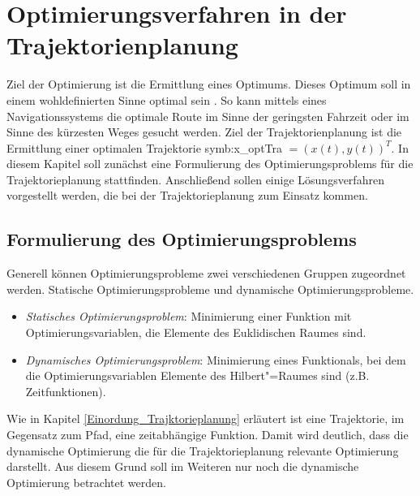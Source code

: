 \section{Optimierungsverfahren in der Trajektorienplanung}
Ziel der Optimierung ist die Ermittlung eines Optimums. 
Dieses Optimum soll in einem wohldefinierten Sinne optimal sein \cite{Ziegler2017}.
So kann mittels eines Navigationssystems die optimale Route im Sinne der geringsten Fahrzeit oder im Sinne des k\"urzesten Weges gesucht werden.
Ziel der Trajektorienplanung ist die Ermittlung einer optimalen Trajektorie \gls{symb:x_optTra} \( = (x(t), y(t))^T \). 
In diesem Kapitel soll zun\"achst eine Formulierung des Optimierungsproblems f\"ur die Trajektorieplanung stattfinden.
Anschlie{\ss}end sollen einige L\"osungsverfahren vorgestellt werden, die bei der Trajektorieplanung zum Einsatz kommen.


\subsection{Formulierung des Optimierungsproblems}
Generell k\"onnen Optimierungsprobleme zwei verschiedenen Gruppen zugeordnet werden. 
Statische Optimierungsprobleme und dynamische Optimierungsprobleme.

\begin{itemize}
\item \textit{Statisches Optimierungsproblem}: Minimierung einer Funktion mit Optimierungsvariablen,
die Elemente des Euklidischen Raumes sind.
\item \textit{Dynamisches Optimierungsproblem}: Minimierung eines Funktionals, bei dem die
Optimierungsvariablen Elemente des Hilbert"=Raumes sind (z.B. Zeitfunktionen). \cite{Graichen2012}
\end{itemize}

Wie in Kapitel \ref{Einordung_Trajktorieplanung} erl\"autert ist eine Trajektorie, im Gegensatz zum Pfad, eine zeitabh\"angige Funktion.
Damit wird deutlich, dass die dynamische Optimierung die f\"ur die Trajektorieplanung relevante Optimierung darstellt. 
Aus diesem Grund soll im Weiteren nur noch die dynamische Optimierung betrachtet werden.

